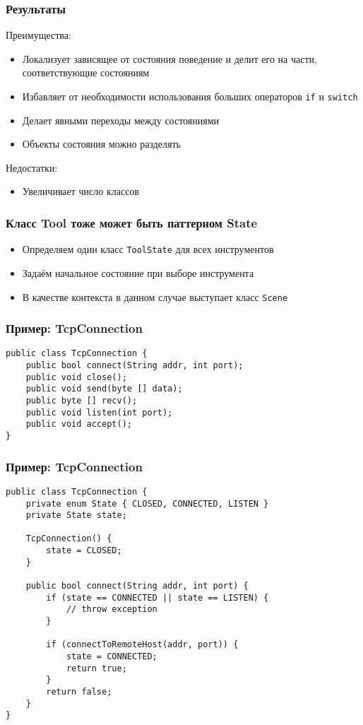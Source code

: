 \documentclass[handout]{beamer}
\begin{document}
\begin{frame}[fragile]
\frametitle{Результаты}
Преимущества:
\begin{itemize}
\item Локализует зависящее от состояния поведение и делит его
      на части, соответствующие состояниям
\item Избавляет от необходимости использования больших операторов
      \lstinline{if} и \lstinline{switch}
\item Делает явными переходы между состояниями
\item Объекты состояния можно разделять
\end{itemize}

\vspace{1cm}

Недостатки:
\begin{itemize}
\item Увеличивает число классов
\end{itemize}
\end{frame}


\begin{frame}[fragile]
\frametitle{Класс Tool тоже может быть паттерном State}
\begin{itemize}
\item Определяем один класс \lstinline{ToolState} для всех инструментов
\item Задаём начальное состояние при выборе инструмента
\item В качестве контекста в данном случае выступает класс \lstinline{Scene}
\end{itemize}
\end{frame}


\begin{frame}[fragile]
\frametitle{Пример: TcpConnection}
\begin{lstlisting}
public class TcpConnection {
    public bool connect(String addr, int port);
    public void close();    
    public void send(byte [] data);
    public byte [] recv();
    public void listen(int port);
    public void accept();
}
\end{lstlisting}
\end{frame}


\begin{frame}[fragile]
\frametitle{Пример: TcpConnection}
\begin{lstlisting}
public class TcpConnection {
    private enum State { CLOSED, CONNECTED, LISTEN }
    private State state;
    
    TcpConnection() {
        state = CLOSED;
    }
    
    public bool connect(String addr, int port) {
        if (state == CONNECTED || state == LISTEN) {
            // throw exception
        }
        
        if (connectToRemoteHost(addr, port)) {
            state = CONNECTED;
            return true;
        }
        return false;
    }
}
\end{lstlisting}
\end{frame}
\end{document}
